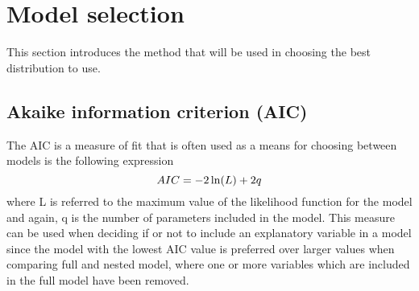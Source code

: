 \section{Model selection}
This section introduces the method that will be used in choosing the best distribution to use.
\subsection{Akaike information criterion (AIC)}
The AIC is a measure of fit that is often used as a means for choosing between models is the following expression
\begin{equation}
	\centering
	AIC = -2\ln(L) + 2q
\end{equation}
where L is referred to the maximum value of the likelihood function for the model and again, q is the number of parameters included in the model. This measure can be used when deciding if or not to include an explanatory variable in a model since the model with the lowest AIC value is preferred over larger values when comparing full and nested model, where one or more variables which are included in the full model have been removed.
